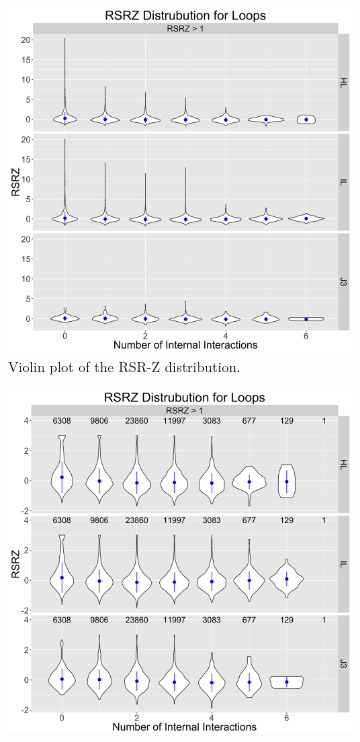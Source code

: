 \begin{figure}
  \begin{subfigure}[b]{0.45\textwidth}
    \includegraphics[width=\textwidth]{chapter-5/figs/loops/rsrz-violin}
    \caption{Violin plot of the RSR-Z distribution.}
\label{fig:rsrz-dist}
  \end{subfigure}
  \begin{subfigure}[b]{0.45\textwidth}
    \includegraphics[width=\textwidth]{chapter-5/figs/loops/rsrz-violin-truncated}

\end{subfigure}
\end{figure}
